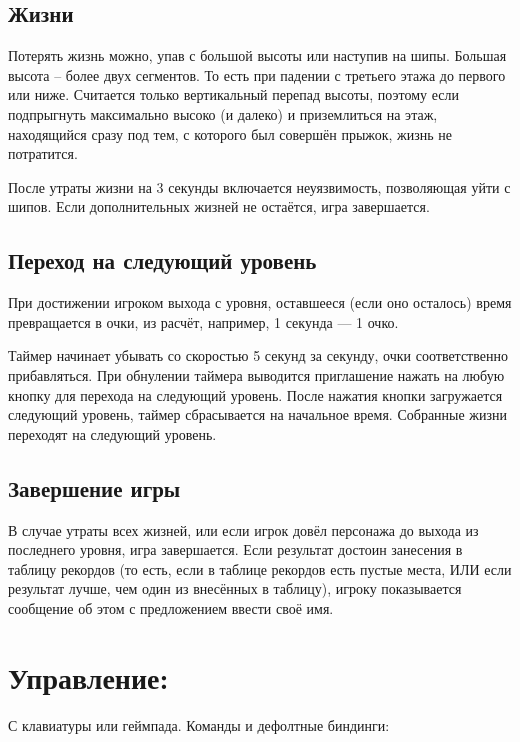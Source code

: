 \documentclass[12pt,a4paper]{article}
\begin{document}
\subsection{Жизни}
Потерять жизнь можно, упав с большой высоты или наступив на шипы. Большая высота -- более двух сегментов. То есть при падении с третьего этажа до первого или ниже. Считается только вертикальный перепад высоты, поэтому если подпрыгнуть максимально высоко (и далеко) и приземлиться на этаж, находящийся сразу под тем, с которого был совершён прыжок, жизнь не потратится.

После утраты жизни на 3 секунды включается неуязвимость, позволяющая уйти с шипов. Если дополнительных жизней не остаётся, игра завершается.\\

\subsection{Переход на следующий уровень}
При достижении игроком выхода с уровня, оставшееся (если оно осталось) время превращается в очки, из расчёт, например, 1 секунда --- 1 очко.

Таймер начинает убывать со скоростью 5 секунд за секунду, очки соответственно прибавляться. При обнулении таймера выводится приглашение нажать на любую кнопку для перехода на следующий уровень. После нажатия кнопки загружается следующий уровень, таймер сбрасывается на начальное время. Собранные жизни переходят на следующий уровень.\\

\subsection{Завершение игры}
В случае утраты всех жизней, или если игрок довёл персонажа до выхода из последнего уровня, игра завершается. Если результат достоин занесения в таблицу рекордов (то есть, если в таблице рекордов есть пустые места, ИЛИ если результат лучше, чем один из внесённых в таблицу), игроку показывается сообщение об этом с предложением ввести своё имя.\\

\section{Управление:}
С клавиатуры или геймпада.
Команды и дефолтные биндинги:\\
\end{document}

